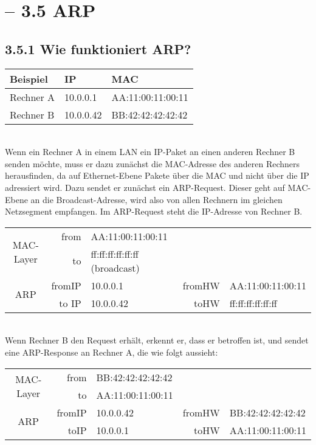 \documentclass[a4paper,
			llpt,
			solution,
			accentcolor=tud2d,
			colorbacktitle
			]
			{tudexercise}
\newcommand{\8}{$\infty$}
\begin{document}
\section{ -- 3.5 ARP}
\subsection{3.5.1 Wie funktioniert ARP?}
\begin{tabular}{l|l|l}
Beispiel        &    IP      &           MAC \\ \hline
Rechner A &    10.0.0.1     &       AA:11:00:11:00:11 \\
Rechner B &    10.0.0.42      &     BB:42:42:42:42:42\\
\end{tabular}\\
Wenn ein Rechner A in einem LAN ein IP-Paket an einen anderen Rechner B
senden möchte, muss er dazu zunächst die MAC-Adresse des anderen Rechners
herausfinden, da auf Ethernet-Ebene Pakete über die MAC und nicht über die IP
adressiert wird.
Dazu sendet er zunächst ein ARP-Request. Dieser geht auf MAC-Ebene an die
Broadcast-Adresse, wird also von allen Rechnern im gleichen Netzsegment
empfangen. Im ARP-Request steht die IP-Adresse von Rechner B.
\begin{tabular}{c|r l r l}
\multirow{2}{*}{MAC-Layer}  &  from & AA:11:00:11:00:11 \\
           &   to  & ff:ff:ff:ff:ff:ff (broadcast) \\ \hline
\multirow{2}{*}{ARP}   &      fromIP& 10.0.0.1   & fromHW & AA:11:00:11:00:11 \\
      &      to IP &  10.0.0.42 &  toHW &   ff:ff:ff:ff:ff:ff \\
\end{tabular}\\
Wenn Rechner B den Request erhält, erkennt er, dass er betroffen ist, und sendet eine ARP-Response an Rechner A, die wie folgt aussieht:\\
\begin{tabular}{c|r l r l}
\multirow{2}{*}{MAC-Layer} &  from&  BB:42:42:42:42:42 \\
          &  to  &  AA:11:00:11:00:11 \\ \hline
\multirow{2}{*}{ARP}      & fromIP & 10.0.0.42 &  fromHW & BB:42:42:42:42:42 \\
          &  toIP & 10.0.0.1  & toHW  &  AA:11:00:11:00:11\\
\end{tabular}
\end{document}
